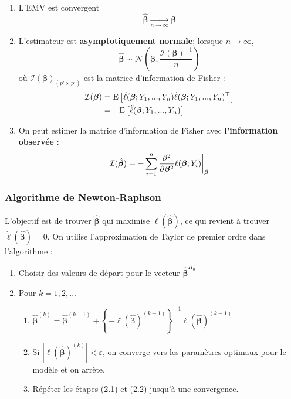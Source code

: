 \documentclass[10pt, french]{article}
\begin{document}
\begin{multicols*}{3}
\begin{enumerate}[label=\faAngleRight]
	\item	L'EMV est convergent
	\[\hat{\bm{\beta}} \underset{n \to \infty}{\longrightarrow} \bm{\beta} \]
	
	\item	L'estimateur est \textbf{asymptotiquement normale}; lorsque $n \to \infty$,
	\[  \hat{\bm{\beta}} \sim \mathcal{N} \left( \bm{\beta}, \frac{\mathcal{I}(\bm{\beta})^{-1}}{n} \right)    \]
	où $\mathcal{I}(\bm{\beta})_{(p' \times p')}$ est la matrice d'information de Fisher : 
	\begin{align*}
		\mathcal{I}(\bm{\beta}) 
			&= \mathrm{E} \left[ \dot{\ell}(\bm{\beta} ; Y_1, ..., Y_n) \dot{\ell}(\bm{\beta} ; Y_1, ..., Y_n)^{\top}  \right] \\
			&= - \mathrm{E} \left[ \ddot{\ell}(\bm{\beta} ; Y_1, ..., Y_n) \right] \\
	\end{align*}
	
	\item	On peut estimer la matrice d'information de Fisher avec \textbf{l'information observée} :
	\[
		\mathcal{I}(\hat{\bm{\beta}}) 
			= -\sum_{i=1}^{n} \frac{\partial^2}{\partial \bm{\beta}^2} \ell(\bm{\beta} ; Y_i)  \biggr \rvert_{\hat{\bm{\beta}}} 
	\]
\end{enumerate}

\subsubsection*{Algorithme de Newton-Raphson}

L'objectif est de trouver $\hat{\bm{\beta}}$ qui maximise $\ell(\hat{\bm{\beta}})$, ce qui revient à trouver $\dot{\ell}(\hat{\bm{\beta}}) = 0$. 
On utilise l'approximation de Taylor de premier ordre dans l'algorithme : 
\begin{enumerate}[label = (\arabic*)]
	\item	Choisir des valeurs de départ pour le vecteur $\hat{\bm{\beta}}^{H_0}$
	\item	Pour $k = 1, 2, ...$
	\begin{enumerate}[label = (2.\arabic*)]
		\item	$\hat{\bm{\beta}}^{(k)} = \hat{\bm{\beta}}^{(k-1)} +  \left \{ - \ddot{\ell}(\hat{\bm{\beta}})^{(k-1)} \right \}^{-1} \dot{\ell}(\hat{\bm{\beta}})^{(k-1)}$
		\item	Si $|\dot{\ell}(\hat{\bm{\beta}})^{(k)}| < \varepsilon $, on converge vers les paramètres optimaux pour le modèle et on arrète.
		\item	Répéter les étapes (2.1) et (2.2) jusqu'à une convergence.
\end{enumerate}
\end{enumerate}


\end{multicols*}
\end{document}
